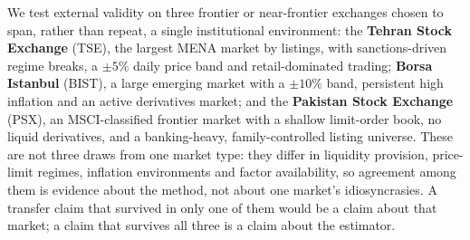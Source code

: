 \documentclass[12pt]{article}
\begin{document}
We test external validity on three frontier or near-frontier exchanges chosen to span, rather than repeat, a single institutional environment: the \textbf{Tehran Stock Exchange} (TSE), the largest MENA market by listings, with sanctions-driven regime breaks, a $\pm5\%$ daily price band and retail-dominated trading; \textbf{Borsa Istanbul} (BIST), a large emerging market with a $\pm10\%$ band, persistent high inflation and an active derivatives market; and the \textbf{Pakistan Stock Exchange} (PSX), an MSCI-classified frontier market with a shallow limit-order book, no liquid derivatives, and a banking-heavy, family-controlled listing universe. These are not three draws from one market type: they differ in liquidity provision, price-limit regimes, inflation environments and factor availability, so agreement among them is evidence about the method, not about one market's idiosyncrasies. A transfer claim that survived in only one of them would be a claim about that market; a claim that survives all three is a claim about the estimator.
\end{document}
